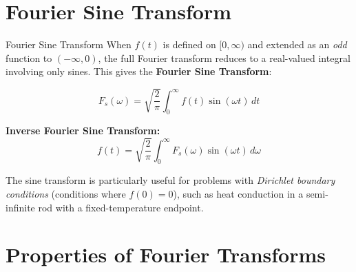 \documentclass[12pt,a4paper]{article}
\begin{document}
\section{Fourier Sine Transform}

\begin{infobox}{Fourier Sine Transform}
When $f(t)$ is defined on $[0,\infty)$ and extended as an \emph{odd} function to $(-\infty,0)$,
the full Fourier transform reduces to a real-valued integral involving only sines.
This gives the \textbf{Fourier Sine Transform}:

\[
  F_s(\omega) = \sqrt{\frac{2}{\pi}}\int_0^\infty f(t)\sin(\omega t)\,dt
\]

\textbf{Inverse Fourier Sine Transform:}
\[
  f(t) = \sqrt{\frac{2}{\pi}}\int_0^\infty F_s(\omega)\sin(\omega t)\,d\omega
\]

The sine transform is particularly useful for problems with \emph{Dirichlet boundary conditions}
(conditions where $f(0) = 0$), such as heat conduction in a semi-infinite rod with a fixed-temperature endpoint.
\end{infobox}

\section{Properties of Fourier Transforms}
\end{document}
